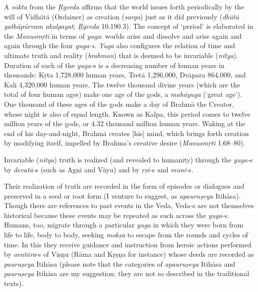 A \textit{sūkta} from the \textit{Ṛgveda} affirms that the world issues forth periodically by the will of Vidhātā (Ordainer) as creation (\textit{sarga}) just as it did previously (\textit{dhātā yathāpūrvam akalpayat}; \textit{Ṛgveda} 10.190.3). The concept of ‘period’ is elaborated in the \textit{Manusmṛti}  in terms of \textit{yuga}: worlds arise and dissolve and arise again and again through the four \textit{yuga-s.} \textit{Yuga} also configures the relation of time and ultimate truth and reality (\textit{brahman}) that is deemed to be invariable (\textit{nitya}). Duration of each of the \textit{yuga-}s is a decreasing number of human years in thousands: Kṛta 1,728,000 human years, Tretā 1,296,000, Dvāpara 864,000, and Kali 4,320,000 human years. The twelve thousand divine years (which are the total of four human ages) make one age of the gods, a \textit{mahāyuga} (‘great age’). One thousand of these ages of the gods make a day of Brahmā the Creator, whose night is also of equal length. Known as Kalpa, this period comes to twelve million years of the gods, or 4.32 thousand million human years. Waking at the end of his day-and-night, Brahmā creates [his] mind, which brings forth creation by modifying itself, impelled by Brahma’s creative desire (\textit{Manusmṛti}  1:68–80).

Invariable (\textit{nitya}) truth is realized (and revealed to humanity) through the \textit{yuga-}s by \textit{devatā-}s (such as Agni and Vāyu) and by \textit{ṛṣi-}s and \textit{muni-}s.

Their realization of truth are recorded in the form of episodes or dialogues and preserved in a seed or root form (I venture to suggest, as \textit{apauruṣeya} Itihāsa). Though there are references to past events in the Veda, Veda-s are not themselves historical because these events may be repeated as such across the \textit{yuga-}s. Humans, too, migrate through a particular \textit{yuga} in which they were born from life to life, body to body, seeking \textit{mokṣa} to escape from the rounds and cycles of time. In this they receive guidance and instruction from heroic actions performed by \textit{avatāra}-s of Viṣṇu (Rāma and Kṛṣṇa for instance) whose deeds are recorded as \textit{pauruṣeya} Itihāsa (please note that the categories of \textit{apauruṣeya} Itihāsa and \textit{pauruṣeya} Itihāsa are my suggestion; they are not so described in the traditional texts).

